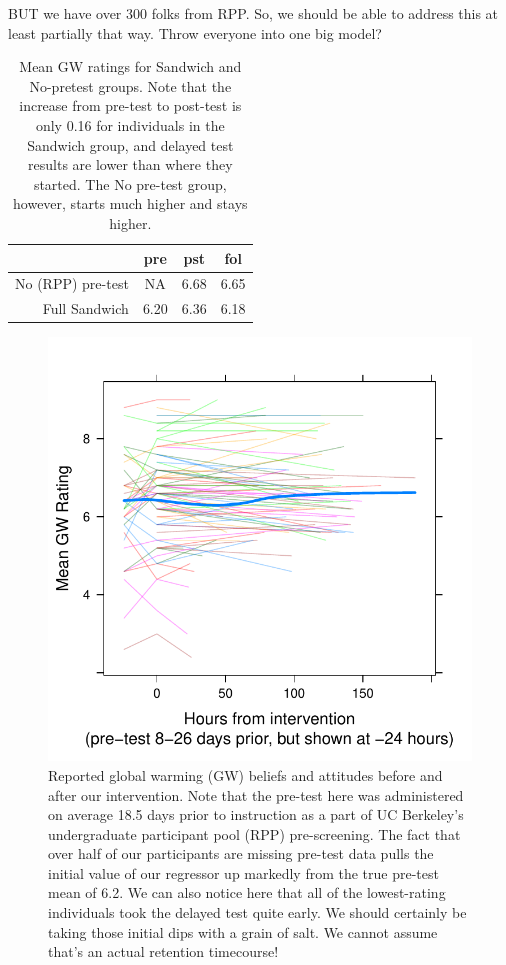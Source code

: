 BUT we have over 300 folks from RPP. So, we should be able to address this at
least partially that way. Throw everyone into one big model?


\begin{table}[ht]
\centering
\caption{Mean GW ratings for Sandwich and No-pretest groups. Note that the
    increase from pre-test to post-test is only 0.16 for individuals in the
    Sandwich group, and delayed test results are lower than where they started.
    The No pre-test group, however, starts much higher and stays higher.}
\label{table:RPP-mech-gw-breakdown}
\begin{tabular}{rccc}
  \toprule
 & pre & pst & fol \\ 
  \midrule
  No (RPP) pre-test & NA & 6.68 & 6.65 \\ 
  Full Sandwich & 6.20 & 6.36 & 6.18 \\ 
   \bottomrule
\end{tabular}
\end{table}

\begin{figure}
    \centering
    \includegraphics{RPP-mech-GW.pdf}
    \caption{Reported global warming (GW) beliefs and attitudes before and after
        our intervention. Note that the pre-test here was administered on
        average 18.5 days prior to instruction as a part of UC Berkeley's
        undergraduate participant pool (RPP) pre-screening. The fact that over
        half of our participants are missing pre-test data pulls the initial
        value of our regressor up markedly from the true pre-test mean of 6.2.
        We can also notice here that all of the lowest-rating individuals took
        the delayed test quite early. We should certainly be taking those
        initial dips with a grain of salt. We cannot assume that's an actual
        retention timecourse!}
    \label{fig:RPP-mech-GW}
\end{figure}


